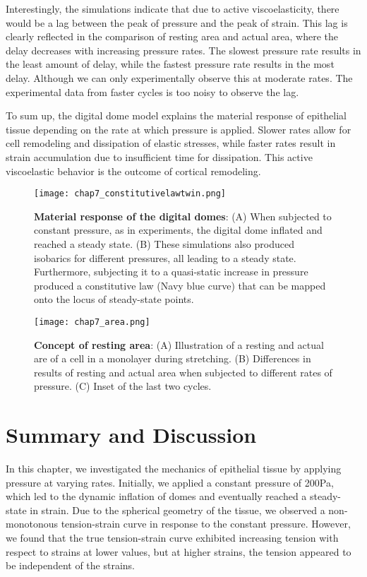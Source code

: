 Interestingly, the simulations indicate that due to active viscoelasticity, there would be a lag between the peak of pressure and the peak of strain. This lag is clearly reflected in the comparison of resting area and actual area, where the delay decreases with increasing pressure rates. The slowest pressure rate results in the least amount of delay, while the fastest pressure rate results in the most delay. Although we can only experimentally observe this at moderate rates. The experimental data from faster cycles is too noisy to observe the lag.

To sum up, the digital dome model explains the material response of epithelial tissue depending on the rate at which pressure is applied. Slower rates allow for cell remodeling and dissipation of elastic stresses, while faster rates result in strain accumulation due to insufficient time for dissipation. This active viscoelastic behavior is the outcome of cortical remodeling.

\begin{figure}[t]
	\centering
	\texttt{[image: chap7\_constitutivelawtwin.png]}
	\caption{\label{fig_7_7} \textbf{Material response of the digital domes}: (A)  When subjected to constant pressure, as in experiments, the digital dome inflated and reached a steady state. (B)  These simulations also produced isobarics for different pressures, all leading to a steady state. Furthermore, subjecting it to a quasi-static increase in pressure produced a constitutive law (Navy blue curve) that can be mapped onto the locus of steady-state points.}
\end{figure}

\begin{figure}
	\centering
	\texttt{[image: chap7\_area.png]}
	\caption{\label{fig_7_8} \textbf{Concept of resting area}: (A) Illustration of a resting and actual are of a cell in a monolayer during stretching. (B) Differences in results of resting and actual area when subjected to different rates of pressure. (C) Inset of the last two cycles.
	}
\end{figure}

\newpage
\hypertarget{summary}{%
	\section{Summary and Discussion}\label{summary}}

In this chapter, we investigated the mechanics of epithelial tissue by applying pressure at varying rates. Initially, we applied a constant pressure of 200Pa, which led to the dynamic inflation of domes and eventually reached a steady-state in strain. Due to the spherical geometry of the tissue, we observed a non-monotonous tension-strain curve in response to the constant pressure. However, we found that the true tension-strain curve exhibited increasing tension with respect to strains at lower values, but at higher strains, the tension appeared to be independent of the strains.


